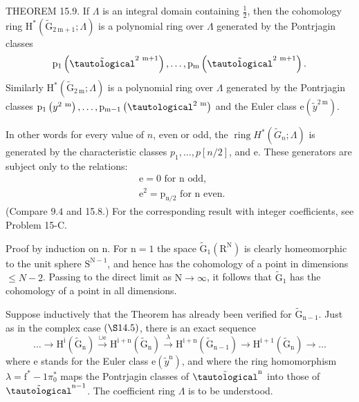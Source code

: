 \documentclass[10pt]{article}
\begin{document}
THEOREM 15.9. If $\Lambda$ is an integral domain containing $\frac{1}{2}$, then the cohomology ring $\mathrm{H}^{*}\left(\widetilde{\mathrm{G}}_{2 \mathrm{~m}+1} ; \Lambda\right)$ is a polynomial ring over $\Lambda$ generated by the Pontrjagin classes
$$
\mathrm{p}_{1}\left(\tilde{\tautological}^{2 \mathrm{~m}+1}\right), \ldots, \mathrm{p}_{\mathrm{m}}\left(\tilde{\tautological}^{2 \mathrm{~m}+1}\right) .
$$
Similarly $\mathrm{H}^{*}\left(\widetilde{\mathrm{G}}_{2 \mathrm{~m}} ; \Lambda\right)$ is a polynomial ring over $\Lambda$ generated by the Pontrjagin classes $\mathrm{p}_{1}\left(y^{2 \mathrm{~m}}\right), \ldots, \mathrm{p}_{\mathrm{m}-1}\left(\tautological^{2 \mathrm{~m}}\right)$ and the Euler class $\mathrm{e}\left(\tilde{y}^{2 \mathrm{~m}}\right)$.

In other words for every value of $n$, even or odd, the $\operatorname{ring} H^{*}\left(\widetilde{G}_{n} ; \Lambda\right)$ is generated by the characteristic classes $p_{1}, \ldots, p[n / 2]$, and e. These generators are subject only to the relations:
$$
\begin{aligned}
&\mathrm{e}=0 \text { for } \mathrm{n} \text { odd, } \\
&\mathrm{e}^{2}=\mathrm{p}_{\mathrm{n} / 2} \text { for } \mathrm{n} \text { even. }
\end{aligned}
$$
(Compare $9.4$ and 15.8.) For the corresponding result with integer coefficients, see Problem 15-C.

Proof by induction on $\mathrm{n}$. For $\mathrm{n}=1$ the space $\widetilde{\mathrm{G}}_{1}\left(\mathrm{R}^{\mathrm{N}}\right)$ is clearly homeomorphic to the unit sphere $\mathrm{S}^{\mathrm{N}-1}$, and hence has the cohomology of a point in dimensions $\leq N-2$. Passing to the direct limit as $\mathrm{N} \rightarrow \infty$, it follows that $\widetilde{\mathrm{G}}_{1}$ has the cohomology of a point in all dimensions.

Suppose inductively that the Theorem has already been verified for $\widetilde{\mathrm{G}}_{\mathrm{n}-1}$. Just as in the complex case $(\S 14.5)$, there is an exact sequence
$$
\ldots \longrightarrow \mathrm{H}^{\mathrm{i}}\left(\widetilde{\mathrm{G}}_{\mathrm{n}}\right) \stackrel{\cup \mathrm{e}}{\longrightarrow} \mathrm{H}^{\mathrm{i}+\mathrm{n}}\left(\widetilde{\mathrm{G}}_{\mathrm{n}}\right) \stackrel{\lambda}{\longrightarrow} \mathrm{H}^{\mathrm{i}+\mathrm{n}}\left(\widetilde{\mathrm{G}}_{\mathrm{n}-1}\right) \longrightarrow \mathrm{H}^{\mathrm{i}+1}\left(\widetilde{\mathrm{G}}_{\mathrm{n}}\right) \longrightarrow \ldots
$$
where e stands for the Euler class $\mathrm{e}\left(\tilde{y}^{\mathrm{n}}\right)$, and where the ring homomorphism $\lambda=\mathrm{f}^{*}-1 \pi_{0}^{*}$ maps the Pontrjagin classes of $\tilde{\tautological}^{\mathrm{n}}$ into those of $\tilde{\tautological}^{\mathrm{n}-1}$. The coefficient ring $\Lambda$ is to be understood.
\end{document}
